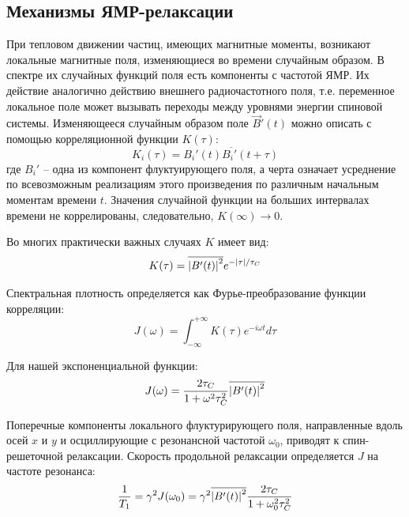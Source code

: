 \subsection{Механизмы ЯМР-релаксации}
При тепловом движении частиц, имеющих магнитные моменты, возникают локальные магнитные поля, изменяющиеся во времени случайным образом. В спектре их случайных функций поля есть компоненты с частотой ЯМР. Их действие аналогично действию внешнего радиочастотного поля, т.е. переменное локальное поле может вызывать переходы между уровнями энергии спиновой системы. Изменяющееся случайным образом поле $ \vec{B}'(t) $ можно описать с помощью корреляционной функции $ K(\tau) $:
\begin{equation}
\label{korrel_function_def}
K_i (\tau) = \overline{B_i'(t) B_i'(t+\tau)}
\end{equation}
где $ B_i' $ -- одна из компонент флуктуирующего поля, а черта означает усреднение по всевозможным реализациям этого произведения по различным начальным моментам времени $ t $. Значения случайной функции на больших интервалах времени не коррелированы, следовательно, $K(\infty) \rightarrow 0$.

Во многих практически важных случаях $K$ имеет вид:
\begin{equation}
\label{K_exponential}
K(\tau) = \overline{\left|B'(t)\right|^2} e^{-\left|\tau\right|/\tau_C}
\end{equation}

Спектральная плотность определяется как Фурье-преобразование функции корреляции:
\begin{equation}
\label{Spectre-power-def}
J(\omega) = \int_{-\infty}^{+\infty} K(\tau) e^{-i \omega t} d\tau
\end{equation}

Для нашей экспоненциальной функции:
\begin{equation}
\label{Spectre-power-exp}
J(\omega) = \dfrac{2\tau_C}{1 + \omega^2 \tau_C^2} \overline{\left|B'(t)\right|^2}
\end{equation}

Поперечные компоненты локального флуктурирующего поля, направленные вдоль осей $x$ и $ y $ и осциллирующие с резонансной частотой $ \omega_0 $, приводят к спин-решеточной релаксации. Скорость продольной релаксации определяется $J$ на частоте резонанса:
\begin{equation}
\label{T_1-of-J}
\dfrac{1}{T_1} = \gamma^2 J(\omega_0) = \gamma^2 \overline{\left|B'(t)\right|^2} \dfrac{2 \tau_C}{1 + \omega_0^2 \tau_C^2}
\end{equation}

